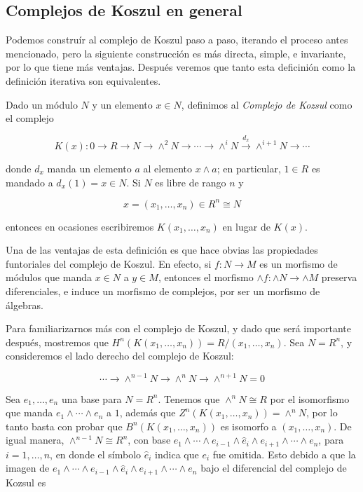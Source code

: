 \subsection{Complejos de Koszul en general}

Podemos construír al complejo de Koszul paso a paso, iterando el proceso antes mencionado, pero la siguiente construcción es más directa, simple, e invariante, por lo que tiene más ventajas. Después veremos que tanto esta deficinión como la definición iterativa son equivalentes.

\begin{definition}

Dado un módulo $N$ y un elemento $x \in N$, definimos al \emph{Complejo de Kozsul} como el complejo

$$ K(x):0 \rightarrow R \rightarrow N \rightarrow \wedge^2N \rightarrow \cdots \rightarrow \wedge^iN \xrightarrow{d_x} \wedge^{i+1}N \rightarrow \cdots $$

donde $d_x$ manda un elemento $a$ al elemento $x\wedge a$; en particular, $1 \in R$ es mandado a $d_x(1) = x \in N$. Si $N$ es libre de rango $n$ y

$$ x = (x_1, \dots, x_n) \in R^n \cong N$$

entonces en ocasiones escribiremos $K(x_1,\dots,x_n)$ en lugar de $K(x)$.

\end{definition}

Una de las ventajas de esta definición es que hace obvias las propiedades funtoriales del complejo de Koszul. En efecto, si $f:N \rightarrow M$ es un morfismo de módulos que manda $x \in N$ a $y \in M$, entonces el morfismo $\wedge f: \wedge N \rightarrow \wedge M $ preserva diferenciales, e induce un morfismo de complejos, por ser un morfismo de álgebras.

Para familiarizarnos más con el complejo de Koszul, y dado que será importante después, mostremos que $H^n(K(x_1,\dots,x_n)) = R/(x_1,\dots,x_n)$. Sea $N = R^n$, y consideremos el lado derecho del complejo de Koszul:

$$ \cdots \rightarrow \wedge^{n-1}N \rightarrow \wedge^nN \rightarrow \wedge^{n+1}N = 0 $$

Sea $e_1, \dots, e_n$ una base para $N = R^n$. Tenemos que $\wedge^nN \cong R$ por el isomorfismo que manda $e_1\wedge\cdots\wedge e_n$ a $1$, además que $Z^n(K(x_1,\dots,x_n)) =  \wedge^nN$, por lo tanto basta con probar que $B^n(K(x_1,\dots,x_n))$ es isomorfo a $(x_1,\dots,x_n)$. De igual manera, $\wedge^{n-1}N\cong R^n$, con base $e_1\wedge\cdots\wedge e_{i-1}\wedge \hat{e}_i\wedge e_{i+1}\wedge\cdots\wedge e_n$, para $i = 1,\dots,n$, en donde el símbolo $\hat{e}_i$ indica que $e_i$ fue omitida. Esto debido a que la imagen de $e_1\wedge\cdots\wedge e_{i-1}\wedge \hat{e}_i\wedge e_{i+1}\wedge\cdots\wedge e_n$ bajo el diferencial del complejo de Kozsul es

